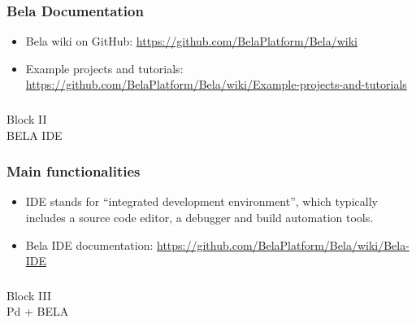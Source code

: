 \documentclass[screen, aspectratio=169]{beamer}
\begin{document}
%
\begin{frame}
  \frametitle{Bela Documentation}
 \begin{itemize}
\item Bela wiki on GitHub: \url{https://github.com/BelaPlatform/Bela/wiki}
\item Example projects and tutorials: \url{https://github.com/BelaPlatform/Bela/wiki/Example-projects-and-tutorials}
\end{itemize}
\end{frame}
%
%
%
\usebackgroundtemplate{}
\begin{frame}
\frametitle{}
{\huge Block II\\BELA IDE }
\end{frame}
%
\begin{frame}
  \frametitle{Main functionalities}
   \begin{itemize}
\item IDE stands for ``integrated development environment'', which typically includes a source code editor, a debugger and build automation tools.
\item Bela IDE documentation: \url{https://github.com/BelaPlatform/Bela/wiki/Bela-IDE}
\end{itemize}
\end{frame}
%
\usebackgroundtemplate{}
\begin{frame}
\frametitle{}
{\huge Block III\\Pd + BELA}
\end{frame}
\end{document}
